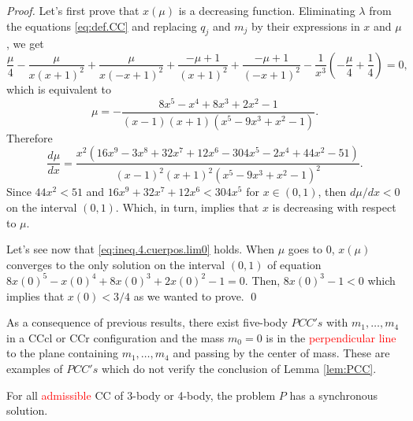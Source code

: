 \documentclass[smallcondensed]{svjour3}
\begin{document}
\begin{proof}
Let's first prove that $x(\mu)$ is a decreasing function. Eliminating $\lambda$ from the equations \eqref{eq:def.CC} and replacing $q_j$ and $m_j$ by their expressions in $x$ and $\mu$, we get
\[\frac{\mu}{4} - \frac{\mu}{x \left(x + 1\right)^{2}} + \frac{\mu}{x \left(- x + 1\right)^{2}} + \frac{- \mu + 1}{\left(x + 1\right)^{2}} + \frac{- \mu + 1}{\left(- x + 1\right)^{2}} - \frac{1}{x^{3}} \left(- \frac{\mu}{4} + \frac{1}{4}\right) = 0,\]
which is equivalent to
 \[\mu=- \frac{8 x^{5} - x^{4} + 8 x^{3} + 2 x^{2} - 1}{\left(x - 1\right) \left(x + 1\right) \left(x^{5} - 9 x^{3} + x^{2} - 1\right)}.\]
Therefore
\[
 \frac{d\mu}{dx}=\frac{x^{2} \left(16 x^{9} - 3 x^{8} + 32 x^{7} + 12 x^{6} - 304 x^{5} - 2 x^{4} + 44 x^{2} - 51\right)}{\left(x - 1\right)^{2} \left(x + 1\right)^{2} \left(x^{5} - 9 x^{3} + x^{2} - 1\right)^{2}}.
\]
Since $44x^2<51$ and $16 x^{9}  + 32 x^{7} + 12 x^{6} < 304 x^{5}$ for $x\in (0,1)$, then $d\mu/dx<0$ on the interval $ (0,1)$. Which, in turn, implies that $x$ is decreasing with respect to $\mu$.





Let's see now that \eqref{eq:ineq.4.cuerpos.lim0} holds. When $\mu$ goes to $0$, $x(\mu)$ converges to the only solution  on the interval $(0,1)$ of  equation $8 x(0)^{5} - x(0)^{4} + 8 x(0)^{3} + 2 x(0)^{2} - 1=0$.  Then,  $ 8 x(0)^{3} -1< 0$ which implies that $x(0)<3/4$ as we wanted to prove.
\qed\end{proof}


\begin{remark}
As a consequence of previous results, there exist five-body $PCC's$ with $m_1,\ldots,m_4$  in a CCcl or CCr configuration and the mass $m_0=0$ is in the  \textcolor{red}{perpendicular line} to the  plane containing $m_1,\ldots,m_4$ and passing by the center of mass. These are examples of $PCC's$ which do not verify the conclusion of Lemma \ref{lem:PCC}.
\end{remark}


\begin{corollary}
For all  \textcolor{red}{admissible} CC of 3-body or 4-body, the  problem $P$ has a synchronous solution.
\end{corollary}
\end{document}
